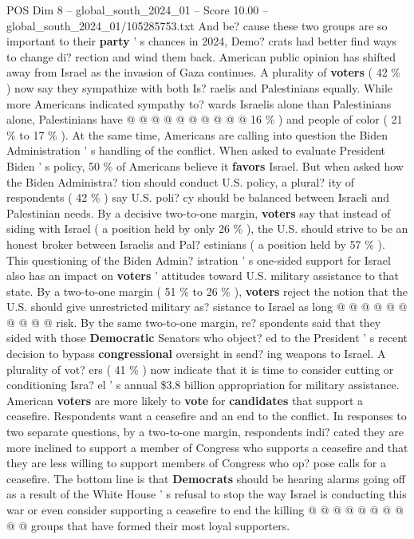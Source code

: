 \begin{textsample}{POS Dim 8 – global\_south\_2024\_01 – Score 10.00 – global\_south\_2024\_01/105285753.txt}
And be? cause these two groups are so important to their \textbf{party} ' s chances in 2024, Demo? crats had better find ways to change di? rection and wind them back.
American public opinion has shifted away from Israel as the invasion of Gaza continues.
A plurality of \textbf{voters} ( 42 \% ) now say they sympathize with both Is? raelis and Palestinians equally.
While more Americans indicated sympathy to? wards Israelis alone than Palestinians alone, Palestinians have @ @ @ @ @ @ @ @ @ @ 16 \% ) and people of color ( 21 \% to 17 \% ).
At the same time, Americans are calling into question the Biden Administration ' s handling of the conflict.
When asked to evaluate President Biden ' s policy, 50 \% of Americans believe it \textbf{favors} Israel.
But when asked how the Biden Administra? tion should conduct U.S. policy, a plural? ity of respondents ( 42 \% ) say U.S. poli? cy should be balanced between Israeli and Palestinian needs.
By a decisive two-to-one margin, \textbf{voters} say that instead of siding with Israel ( a position held by only 26 \% ), the U.S. should strive to be an honest broker between Israelis and Pal? estinians ( a position held by 57 \% ).
This questioning of the Biden Admin? istration ' s one-sided support for Israel also has an impact on \textbf{voters} ' attitudes toward U.S. military assistance to that state.
By a two-to-one margin ( 51 \% to 26 \% ), \textbf{voters} reject the notion that the U.S. should give unrestricted military as? sistance to Israel as long @ @ @ @ @ @ @ @ @ @ risk.
By the same two-to-one margin, re? spondents said that they sided with those \textbf{Democratic} Senators who object? ed to the President ' s recent decision to bypass \textbf{congressional} oversight in send? ing weapons to Israel.
A plurality of vot? ers ( 41 \% ) now indicate that it is time to consider cutting or conditioning Isra? el ' s annual \$3.8 billion appropriation for military assistance.
American \textbf{voters} are more likely to \textbf{vote} for \textbf{candidates} that support a ceasefire.
Respondents want a ceasefire and an end to the conflict.
In responses to two separate questions, by a two-to-one margin, respondents indi? cated they are more inclined to support a member of Congress who supports a ceasefire and that they are less willing to support members of Congress who op? pose calls for a ceasefire.
The bottom line is that \textbf{Democrats} should be hearing alarms going off as a result of the White House ' s refusal to stop the way Israel is conducting this war or even consider supporting a ceasefire to end the killing @ @ @ @ @ @ @ @ @ @ groups that have formed their most loyal supporters.

\end{textsample}

